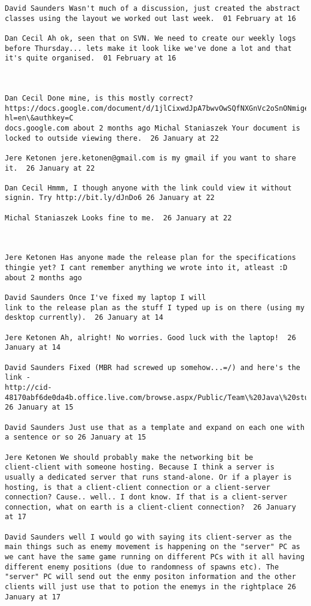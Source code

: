\begin{verbatim}
David Saunders Wasn't much of a discussion, just created the abstract
classes using the layout we worked out last week.  01 February at 16

Dan Cecil Ah ok, seen that on SVN. We need to create our weekly logs
before Thursday... lets make it look like we've done a lot and that
it's quite organised.  01 February at 16



Dan Cecil Done mine, is this mostly correct?
https://docs.google.com/document/d/1jlCixwdJpA7bwvOwSQfNXGnVc2oSnONmigeV3pKJ6VY/edit?hl=en\&authkey=C
docs.google.com about 2 months ago Michal Staniaszek Your document is
locked to outside viewing there.  26 January at 22

Jere Ketonen jere.ketonen@gmail.com is my gmail if you want to share
it.  26 January at 22

Dan Cecil Hmmm, I though anyone with the link could view it without
signin. Try http://bit.ly/dJnDo6 26 January at 22

Michal Staniaszek Looks fine to me.  26 January at 22



Jere Ketonen Has anyone made the release plan for the specifications
thingie yet? I cant remember anything we wrote into it, atleast :D
about 2 months ago 

David Saunders Once I've fixed my laptop I will
link to the release plan as the stuff I typed up is on there (using my
desktop currently).  26 January at 14

Jere Ketonen Ah, alright! No worries. Good luck with the laptop!  26
January at 14

David Saunders Fixed (MBR had screwed up somehow...=/) and here's the
link -
http://cid-48170abf6de0da4b.office.live.com/browse.aspx/Public/Team\%20Java\%20stuffs
26 January at 15

David Saunders Just use that as a template and expand on each one with
a sentence or so 26 January at 15

Jere Ketonen We should probably make the networking bit be
client-client with someone hosting. Because I think a server is
usually a dedicated server that runs stand-alone. Or if a player is
hosting, is that a client-client connection or a client-server
connection? Cause.. well.. I dont know. If that is a client-server
connection, what on earth is a client-client connection?  26 January
at 17

David Saunders well I would go with saying its client-server as the
main things such as enemy movement is happening on the "server" PC as
we cant have the same game running on different PCs with it all having
different enemy positions (due to randomness of spawns etc). The
"server" PC will send out the enmy positon information and the other
clients will just use that to potion the enemys in the rightplace 26
January at 17


\end{verbatim}

